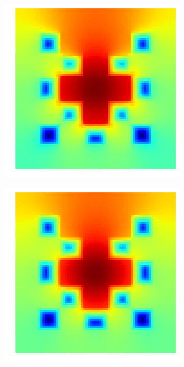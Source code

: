 \begin{figure}[h]
\centering
\begin{subfigure}{0.49\columnwidth}
\includegraphics[width=\columnwidth]{images/checkerboard2d_p1_neumann_staggered_starmap.png}
\end{subfigure}%
\hspace{0.01\columnwidth}
\begin{subfigure}{0.49\columnwidth}
\includegraphics[width=\columnwidth]{images/checkerboard2d_p1_neumann_staggered.png}

\end{subfigure}
\end{figure}
